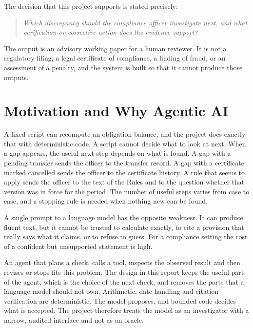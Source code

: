 The decision that this project supports is stated precisely:

\begin{quote}
\emph{Which discrepancy should the compliance officer investigate next, and what verification or
corrective action does the evidence support?}
\end{quote}

The output is an advisory working paper for a human reviewer. It is not a regulatory filing, a legal
certificate of compliance, a finding of fraud, or an assessment of a penalty, and the system is built
so that it cannot produce those outputs.

\section{Motivation and Why Agentic AI}
A fixed script can recompute an obligation balance, and the project does exactly that with deterministic
code. A script cannot decide what to look at next. When a gap appears, the useful next step depends on
what is found. A gap with a pending transfer sends the officer to the transfer record. A gap with a
certificate marked cancelled sends the officer to the certificate history. A rule that seems to apply
sends the officer to the text of the Rules and to the question whether that version was in force for
the period. The number of useful steps varies from case to case, and a stopping rule is needed when
nothing new can be found.

A single prompt to a language model has the opposite weakness. It can produce fluent text, but it cannot be
trusted to calculate exactly, to cite a provision that really says what it claims, or to refuse to guess.
For a compliance setting the cost of a confident but unsupported statement is high.

An agent that plans a check, calls a tool, inspects the observed result and then revises or stops
fits this problem. The design in this report keeps the useful part of the agent, which is the choice
of the next check, and removes the parts that a language model should not own. Arithmetic, date handling
and citation verification are deterministic. The model proposes, and bounded code decides what is accepted.
The project therefore treats the model as an investigator with a narrow, audited interface and not as an
oracle.


